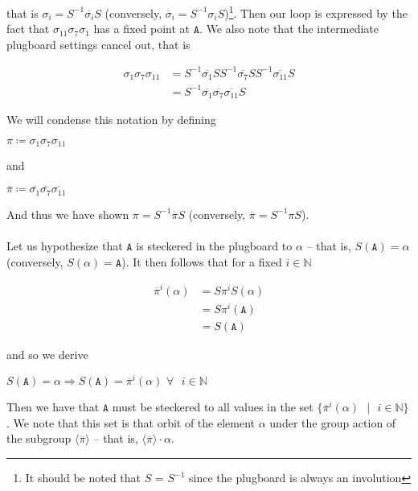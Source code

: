 \noindent that is $\sigma_i = S^{-1}\overline{\sigma_i}S$
(conversely, $\overline\sigma_i = S^{-1}\sigma_iS$)\footnote{It should be noted that $S$ = $S^{-1}$ since the plugboard is always an involution}.
Then our loop is expressed by the fact that
$\sigma_{11}\sigma_7\sigma_1$ has a fixed point at $\texttt{A}$.
We also note that the intermediate plugboard settings cancel out, that is
\begin{center}
	\begin{align*}
		\sigma_{1}\sigma_7\sigma_{11} & =
		S^{-1}\overline{\sigma_{1}}SS^{-1}\overline{\sigma_7}SS^{-1}\overline{\sigma_{11}}S
		\\&= S^{-1}
		\overline{\sigma_{1}}\overline{\sigma_7}\overline{\sigma_{11}}
		S
	\end{align*}
\end{center}
We will condense this notation by defining
\begin{center}
	$\pi \coloneq \sigma_{1}\sigma_7\sigma_{11}$
\end{center}
and
\begin{center}
	$\overline{\pi} \coloneq
		\overline{\sigma_{1}}\overline{\sigma_7}\overline{\sigma_{11}}$
\end{center}
And thus we have shown $\pi = S^{-1}\overline{\pi}S$ (conversely,
$\overline\pi = S^{-1}\pi S$).
\\\\Let us hypothesize that $\texttt{A}$ is steckered in the plugboard to
$\alpha$ -- that is, $S(\texttt{A}) = \alpha$ (conversely, $S(\alpha) = \texttt{A}$).
It then follows that for a fixed $i\in\mathbb{N}$
\begin{center}
	\begin{align*}
		\overline{\pi}^i(\alpha) & = S\pi^i S(\alpha)
		\\&= S \pi^i(\texttt{A})
		\\&= S(\texttt{A})
	\end{align*}
\end{center}
and so we derive
\begin{center}
	$S(\texttt{A}) = \alpha \Rightarrow S(\texttt{A}) = \overline{\pi}^i(\alpha)\text{
		}\forall\text{ }i\in\mathbb{N}$
\end{center}
Then we have that $\texttt{A}$ must be steckered to all values in the set
$\{\overline{\pi}^i(\alpha)\text{ }\vert\text{ }i\in\mathbb{N}\}$.
We note that this set is that orbit of the element $\alpha$ under the
group action of the subgroup $\langle\overline{\pi}\rangle$ -- that is,
$\langle\overline{\pi}\rangle\cdot\alpha$.
